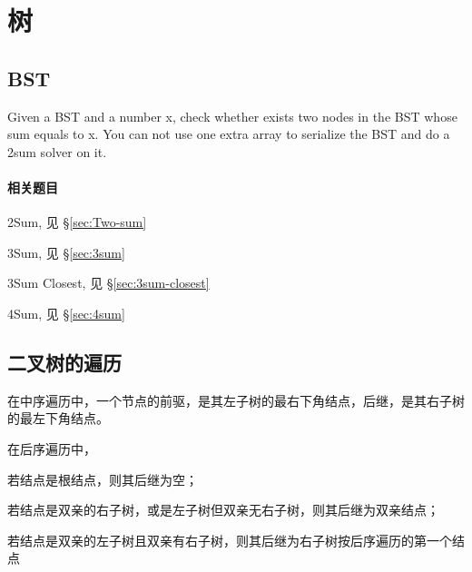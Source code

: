\chapter{树}

\section{BST} %
\label{sec:binarySearchTree}

Given a BST and a number x, check whether exists two nodes in the BST whose sum equals to x. You can not use one extra array to serialize the BST and do a 2sum solver on it.

\subsubsection{相关题目}
\begindot
\item 2Sum, 见 \S \ref{sec:Two-sum}
\item 3Sum, 见 \S \ref{sec:3sum}
\item 3Sum Closest, 见 \S \ref{sec:3sum-closest}
\item 4Sum, 见 \S \ref{sec:4sum}
\myenddot

\section{二叉树的遍历} %
\label{sec:binaryTreeTraversal}

在中序遍历中，一个节点的前驱，是其左子树的最右下角结点，后继，是其右子树的最左下角结点。

在后序遍历中，
\begindot
\item 若结点是根结点，则其后继为空；
\item 若结点是双亲的右子树，或是左子树但双亲无右子树，则其后继为双亲结点；
\item 若结点是双亲的左子树且双亲有右子树，则其后继为右子树按后序遍历的第一个结点
\myenddot


